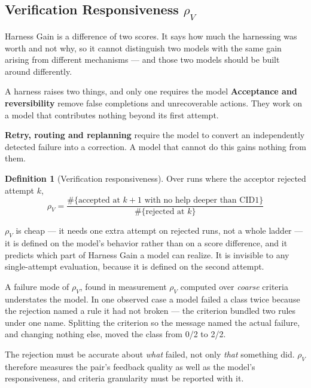\documentclass[11pt]{article}
\theoremstyle{definition}
\newtheorem{definition}{Definition}
\newcommand{\rhov}{\ensuremath{\rho_V}}
\begin{document}
\subsection{Verification Responsiveness \texorpdfstring{\rhov{}}{rho-V}}\label{sec:rhov}

Harness Gain is a difference of two scores. It says how much the harnessing was worth and not why, so it cannot distinguish two models with the same gain arising from different mechanisms --- and those two models should be built around differently.

\begin{claimbox}{A harness raises two things, and only one requires the model}
\textbf{Acceptance and reversibility} remove false completions and unrecoverable actions. They work on a model that contributes nothing beyond its first attempt.

\textbf{Retry, routing and replanning} require the model to convert an independently detected failure into a correction. A model that cannot do this gains nothing from them.
\end{claimbox}

\begin{definition}[Verification responsiveness]
Over runs where the acceptor rejected attempt $k$,
\begin{equation*}
\rhov{} = \frac{\#\{\text{accepted at } k{+}1 \text{ with no help deeper than CID1}\}}{\#\{\text{rejected at } k\}}
\end{equation*}
\end{definition}

\rhov{} is cheap --- it needs one extra attempt on rejected runs, not a whole ladder --- it is defined on the model's behavior rather than on a score difference, and it predicts which part of Harness Gain a model can realize. It is invisible to any single-attempt evaluation, because it is defined on the second attempt.

\begin{cautionbox}{A failure mode of \rhov{}, found in measurement}
\rhov{} computed over \emph{coarse} criteria understates the model. In one observed case a model failed a class twice because the rejection named a rule it had not broken --- the criterion bundled two rules under one name. Splitting the criterion so the message named the actual failure, and changing nothing else, moved the class from 0/2 to 2/2.

The rejection must be accurate about \emph{what} failed, not only \emph{that} something did. \rhov{} therefore measures the pair's feedback quality as well as the model's responsiveness, and criteria granularity must be reported with it.
\end{cautionbox}
\end{document}
